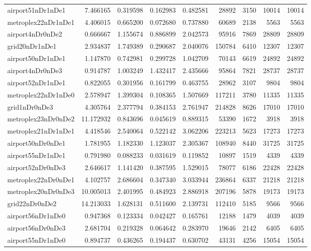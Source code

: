 \begin{longtable}{|l|r|r|r|r|r|r|r|r|}
airport51nDr1nDe1 & 7.466165 & 0.319598 & 0.162983 & 0.482581 & 28892 & 3150 & 10014 & 10014 \\
metroplex22nDr1nDe1 & 4.406015 & 0.665200 & 0.072680 & 0.737880 & 60689 & 2138 & 5563 & 5563 \\
airport4nDr0nDe2 & 0.666667 & 1.155674 & 0.886899 & 2.042573 & 95916 & 7869 & 28809 & 28809 \\
grid20nDr1nDe1 & 2.934837 & 1.749389 & 0.290687 & 2.040076 & 150784 & 6410 & 12307 & 12307 \\
airport50nDr1nDe1 & 1.147870 & 0.742981 & 0.299728 & 1.042709 & 70143 & 6619 & 24892 & 24892 \\
airport4nDr0nDe3 & 0.914787 & 1.003249 & 1.432417 & 2.435666 & 95864 & 7821 & 28737 & 28737 \\
airport52nDr1nDe1 & 0.822055 & 0.301956 & 0.161799 & 0.463755 & 28962 & 3107 & 9804 & 9804 \\
metroplex22nDr1nDe0 & 2.578947 & 1.399304 & 0.108365 & 1.507669 & 117211 & 3780 & 11335 & 11335 \\
grid1nDr0nDe3 & 4.305764 & 2.377794 & 0.384153 & 2.761947 & 214828 & 8626 & 17010 & 17010 \\
metroplex23nDr0nDe2 & 11.172932 & 0.843696 & 0.045619 & 0.889315 & 53390 & 1672 & 3918 & 3918 \\
metroplex21nDr1nDe1 & 4.418546 & 2.540064 & 0.522142 & 3.062206 & 223213 & 5623 & 17273 & 17273 \\
airport50nDr0nDe1 & 1.781955 & 1.182330 & 1.123037 & 2.305367 & 108940 & 8440 & 31725 & 31725 \\
airport55nDr1nDe1 & 0.791980 & 0.088233 & 0.031619 & 0.119852 & 10897 & 1519 & 4339 & 4339 \\
airport52nDr0nDe3 & 2.646617 & 1.141420 & 0.387595 & 1.529015 & 78077 & 6186 & 22428 & 22428 \\
metroplex22nDr0nDe1 & 4.102757 & 2.686604 & 0.347340 & 3.033944 & 236864 & 6337 & 21218 & 21218 \\
metroplex20nDr0nDe3 & 10.005013 & 2.401995 & 0.484923 & 2.886918 & 207196 & 5878 & 19173 & 19173 \\
grid22nDr0nDe2 & 14.213033 & 1.628131 & 0.511600 & 2.139731 & 112410 & 5185 & 9566 & 9566 \\
airport56nDr1nDe0 & 0.947368 & 0.123334 & 0.042427 & 0.165761 & 12188 & 1479 & 4039 & 4039 \\
airport56nDr0nDe3 & 2.681704 & 0.219328 & 0.064642 & 0.283970 & 19646 & 2142 & 6405 & 6405 \\
airport55nDr1nDe0 & 0.894737 & 0.436265 & 0.194437 & 0.630702 & 43131 & 4256 & 15054 & 15054 \\

\end{longtable}
